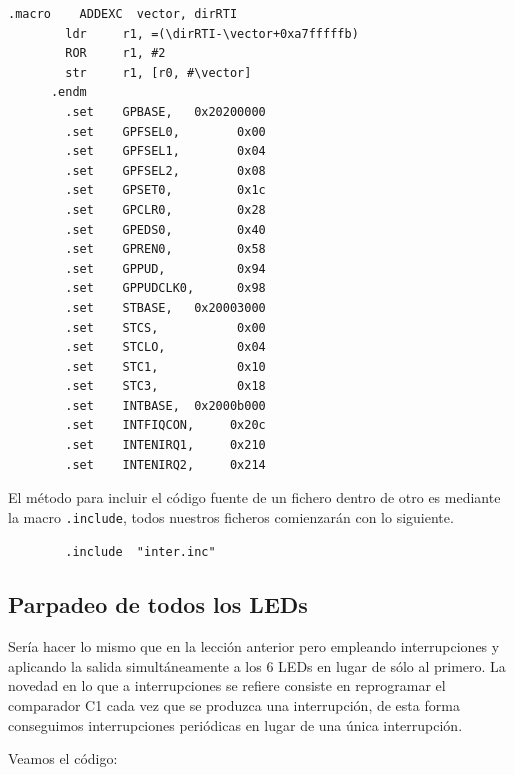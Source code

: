 \begin{lstlisting}[caption={inter.inc},label={lst:codigoPract5_0}]
      .macro    ADDEXC  vector, dirRTI
        ldr     r1, =(\dirRTI-\vector+0xa7fffffb)
        ROR     r1, #2
        str     r1, [r0, #\vector]
      .endm
        .set    GPBASE,   0x20200000
        .set    GPFSEL0,        0x00
        .set    GPFSEL1,        0x04
        .set    GPFSEL2,        0x08
        .set    GPSET0,         0x1c
        .set    GPCLR0,         0x28
        .set    GPEDS0,         0x40
        .set    GPREN0,         0x58
        .set    GPPUD,          0x94
        .set    GPPUDCLK0,      0x98
        .set    STBASE,   0x20003000
        .set    STCS,           0x00
        .set    STCLO,          0x04
        .set    STC1,           0x10
        .set    STC3,           0x18
        .set    INTBASE,  0x2000b000
        .set    INTFIQCON,     0x20c
        .set    INTENIRQ1,     0x210
        .set    INTENIRQ2,     0x214
\end{lstlisting}

\newpage
El método para incluir el código fuente de un fichero dentro de otro es mediante
la macro {\tt .include}, todos nuestros ficheros comienzarán con lo siguiente.

\begin{lstlisting}
        .include  "inter.inc"
\end{lstlisting}

\subsection{Parpadeo de todos los LEDs}

Sería hacer lo mismo que en la lección anterior pero empleando interrupciones y aplicando
la salida simultáneamente a los 6 LEDs en lugar de sólo al primero. La novedad en lo
que a interrupciones se refiere consiste en reprogramar el comparador C1 cada vez que
se produzca una interrupción, de esta forma conseguimos interrupciones periódicas en lugar
de una única interrupción.

Veamos el código:

